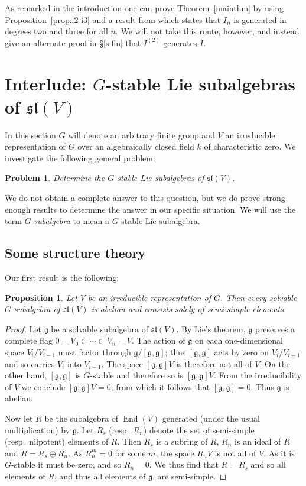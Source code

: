 \documentclass{amsart}
\newtheorem{proposition}[theorem]{Proposition}
\newtheorem{problem}[theorem]{Problem}
\theoremstyle{definition}
\theoremstyle{remark}
\DeclareMathOperator{\End}{End}
\let\mf\mathfrak
\begin{document}
As remarked in the introduction one can prove Theorem~\ref{mainthm} by using
Proposition~\ref{prop:i2-i3} and a result from \cite{HMSV} which states that $I_n$
is generated in degrees two and three for all $n$.  We will not take this route,
however, and instead give an alternate proof in \S \ref{s:fin} that $I^{(2)}$
generates $I$.


\section{Interlude:  $G$-stable Lie subalgebras of $\mf{sl}(V)$}
\label{s-liesub}

In this section $G$ will denote an arbitrary finite group and $V$ an
irreducible representation of $G$ over an algebraically closed field $k$ of
characteristic zero.  We investigate the following general problem:

\begin{problem}
Determine the $G$-stable Lie subalgebras of $\mf{sl}(V)$.
\end{problem}

We do not obtain a complete answer to this question, but we do prove
strong enough results to determine the answer in our specific situation.
We will use the term \emph{$G$-subalgebra} to mean a $G$-stable Lie
subalgebra.


\subsection{Some structure theory}

Our first result is the following:

\begin{proposition}
\label{prop:solv}
Let $V$ be an irreducible representation of $G$.  Then every solvable
$G$-subalgebra of $\mf{sl}(V)$ is abelian and consists solely of semi-simple
elements.
\end{proposition}

\begin{proof}
Let $\mf{g}$ be a solvable subalgebra of $\mf{sl}(V)$.  By Lie's theorem,
$\mf{g}$ preserves a complete flag $0=V_0 \subset \cdots \subset V_n=V$.
The action of $\mf{g}$ on each one-dimensional space $V_i/V_{i-1}$ must factor
through $\mf{g}/[\mf{g}, \mf{g}]$; thus $[\mf{g}, \mf{g}]$ acts by zero on
$V_i/V_{i-1}$ and so carries $V_i$ into $V_{i-1}$.  The space $[\mf{g},
\mf{g}] V$ is therefore not all of $V$.  On the other hand, $[\mf{g}, \mf{g}]$
is $G$-stable and therefore so is $[\mf{g}, \mf{g}] V$.  From the
irreducibility of $V$ we conclude $[\mf{g}, \mf{g}] V=0$, from which it
follows that $[\mf{g}, \mf{g}]=0$.  Thus $\mf{g}$ is abelian.

Now let $R$ be the subalgebra of $\End(V)$ generated (under the usual
multiplication) by $\mf{g}$.  Let $R_s$ (resp.\ $R_n$) denote the set of
semi-simple (resp.\ nilpotent) elements of $R$.  Then $R_s$ is a subring of
$R$, $R_n$ is an ideal of $R$ and $R=R_s \oplus R_n$.  As $R_n^m=0$ for some
$m$, the space $R_n V$ is not all of $V$.  As it is $G$-stable it must be zero,
and so $R_n=0$.  We thus find that $R=R_s$ and so all elements of $R$, and
thus all elements of $\mf{g}$, are semi-simple.
\end{proof}
\end{document}
